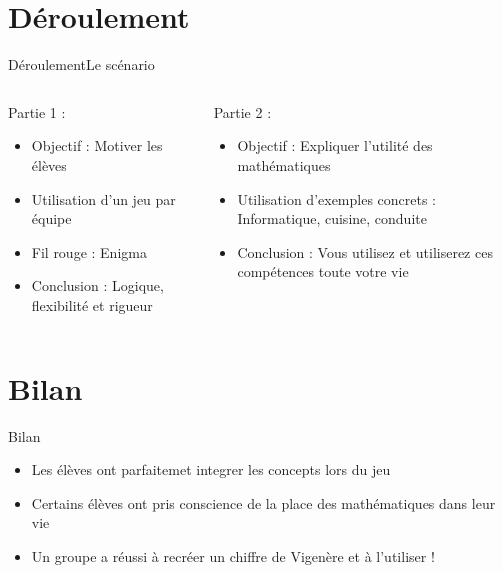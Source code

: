 \documentclass{beamer}
\begin{document}
\section{Déroulement}
\begin{frame}{Déroulement}{Le scénario}

\begin{columns}

\begin{column}{4cm}
	Partie 1 :
	\begin{itemize}
		\item Objectif : Motiver les élèves
		\item Utilisation d'un jeu par équipe
		\item Fil rouge : Enigma
		\item Conclusion : Logique, flexibilité et rigueur
	\end{itemize}
\end{column}

\begin{column}{6cm}
	Partie 2 :
	\begin{itemize}
		\item Objectif : Expliquer l'utilité des mathématiques
		\item Utilisation d'exemples concrets : Informatique, cuisine, conduite
		\item Conclusion : Vous utilisez et utiliserez ces compétences toute votre vie
	\end{itemize}
\end{column}

\end{columns}

\end{frame}

\section{Bilan}

\begin{frame}{Bilan}

  \begin{itemize}
  \item Les élèves ont parfaitemet integrer les concepts lors du jeu
  \item Certains élèves ont pris conscience de la place des mathématiques dans leur vie
  \item Un groupe a réussi à recréer un chiffre de Vigenère et à l'utiliser !
  \end{itemize}
  
 
\end{frame}
\end{document}
